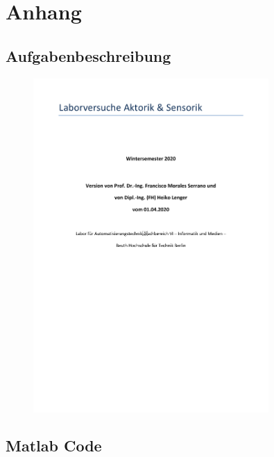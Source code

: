 \section{Anhang}

\subsection{Aufgabenbeschreibung}
\begin{figure}[H]
    \centering
    \includegraphics[page=7, width=0.8\textwidth]{../Aufgabenstellung.pdf}
    \label{fig:Aufgabenstellung Labor 3}
\end{figure}


\subsection{Matlab Code}


